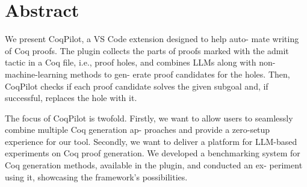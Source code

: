 \section*{Abstract}
We present CoqPilot, a VS Code extension designed to help auto- mate writing of Coq proofs. The plugin collects the parts of proofs marked with the admit tactic in a Coq file, i.e., proof holes, and combines LLMs along with non-machine-learning methods to gen- erate proof candidates for the holes. Then, CoqPilot checks if each proof candidate solves the given subgoal and, if successful, replaces the hole with it. 

The focus of CoqPilot is twofold. Firstly, we want to allow users to seamlessly combine multiple Coq generation ap- proaches and provide a zero-setup experience for our tool. Secondly, we want to deliver a platform for LLM-based experiments on Coq proof generation. We developed a benchmarking system for Coq generation methods, available in the plugin, and conducted an ex- periment using it, showcasing the framework’s possibilities.